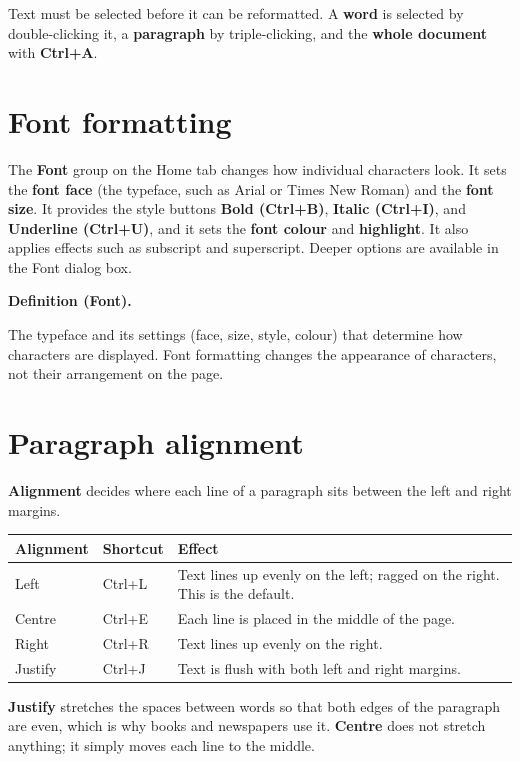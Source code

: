 \documentclass[11pt]{article}
\newenvironment{definitionbox}[1]{%
  \par\noindent\textbf{Definition (#1).}\ \itshape
}{\par\vspace{0.3em}}
\begin{document}
Text must be selected before it can be reformatted. A \textbf{word} is
selected by double-clicking it, a \textbf{paragraph} by triple-clicking, and
the \textbf{whole document} with \textbf{Ctrl+A}.

\section{Font formatting}
The \textbf{Font} group on the Home tab changes how individual characters
look. It sets the \textbf{font face} (the typeface, such as Arial or Times
New Roman) and the \textbf{font size}. It provides the style buttons
\textbf{Bold (Ctrl+B)}, \textbf{Italic (Ctrl+I)}, and \textbf{Underline
(Ctrl+U)}, and it sets the \textbf{font colour} and \textbf{highlight}. It
also applies effects such as subscript and superscript. Deeper options are
available in the Font dialog box.

\begin{definitionbox}{Font}
The typeface and its settings (face, size, style, colour) that determine how
characters are displayed. Font formatting changes the appearance of
characters, not their arrangement on the page.
\end{definitionbox}

\section{Paragraph alignment}
\textbf{Alignment} decides where each line of a paragraph sits between the
left and right margins.

\begin{center}
\begin{tabular}{p{}p{}p{}}
\toprule
\textbf{Alignment} & \textbf{Shortcut} & \textbf{Effect} \\
\midrule
Left & Ctrl+L & Text lines up evenly on the left; ragged on the right. This is the default. \\
Centre & Ctrl+E & Each line is placed in the middle of the page. \\
Right & Ctrl+R & Text lines up evenly on the right. \\
Justify & Ctrl+J & Text is flush with both left and right margins. \\
\bottomrule
\end{tabular}
\end{center}

\textbf{Justify} stretches the spaces between words so that both edges of
the paragraph are even, which is why books and newspapers use it.
\textbf{Centre} does not stretch anything; it simply moves each line to the
middle.
\end{document}
